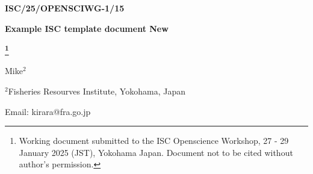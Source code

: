 \thispagestyle{empty}
\begin{flushright}
    \textbf{ISC/25/OPENSCIWG-1/15}
\end{flushright}
\vspace{1in}

\begin{center}

    \textbf{Example ISC template document New}

    \textbf{\footnote{Working document submitted to the ISC Openscience Workshop, 27 - 29 January 2025
    (JST), Yokohama Japan. Document not to be cited without author’s permission.}}
    
    \vspace{0.25in}
    Mike\begin{math}^2\end{math} %

    \vspace{0.25in}

    \begin{math}^2\end{math}Fisheries Resourves Institute, Yokohama, Japan

    \vspace{0.25in}
    Email: kirara@fra.go.jp
\end{center}

\begin{figure}[!hb]
    \begin{center}
    \end{center}
\end{figure}

\clearpage
